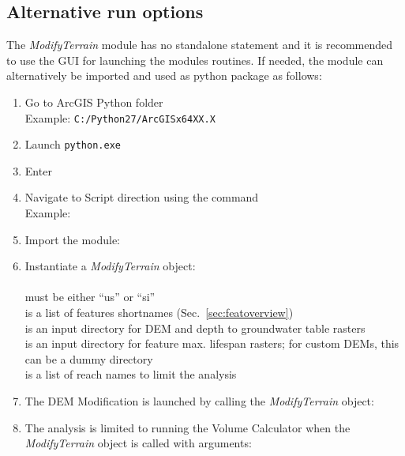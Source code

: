 \subsection{Alternative run options}
\label{sec:mtaltrun}

The \textit{ModifyTerrain} module has no standalone statement and it is recommended to use the GUI for launching the modules routines. If needed, the module can alternatively be imported and used as python package as follows:

\begin{enumerate}
	\item Go to ArcGIS Python folder\\
	Example: \texttt{C:/Python27/ArcGISx64XX.X}
	\item Launch \texttt{python.exe}
	\item Enter 
	\item Navigate to Script direction using the command \\
	Example: 
	\item Import the module: \\
	\item Instantiate a \textit{ModifyTerrain} object:\\
	\\
	 must be either ``us'' or ``si''\\
	 is a list of features shortnames (Sec.~\ref{sec:featoverview})\\
	 is an input directory for DEM and depth to groundwater table rasters\\
	 is an input directory for feature max. lifespan rasters; for custom DEMs, this can be a dummy directory\\
	 is a list of reach names to limit the analysis
	\item The DEM Modification is launched by calling the \textit{ModifyTerrain} object: 
	\item The analysis is limited to running the Volume Calculator when the \textit{ModifyTerrain} object is called with arguments:\\

\end{enumerate}
